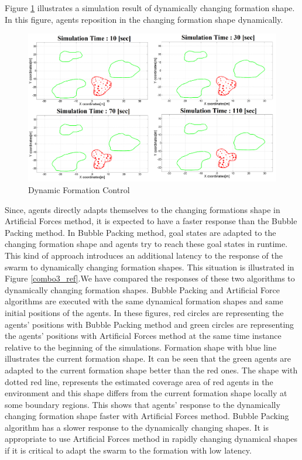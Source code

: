 \documentclass[letterpaper, 10 pt, conference]{ieeeconf}  %
\begin{document}
Figure \ref{multiple2_ref} illustrates a simulation result of dynamically changing formation shape. In this figure, agents reposition in the changing formation shape dynamically. 

\begin{figure}[thpb]
\caption{Dynamic Formation Control} \label{multiple2_ref}
\centerline{\includegraphics[scale = 0.10]{deneme}}
\end{figure} 

Since, agents directly adapts themselves to the changing formations shape in Artificial Forces method, it is expected to have a faster response than the Bubble Packing method. In Bubble Packing method, goal states are adapted to the changing formation shape and agents try to reach these goal states in runtime. This kind of approach introduces an additional latency to the response of the swarm to dynamically changing formation shapes. This situation is illustrated in Figure \ref{combo3_ref}.We have compared the responses of these two algorithms to dynamically changing formation shapes. Bubble Packing and Artificial Force algorithms are executed with the same dynamical formation shapes and same initial positions of the agents. In these figures, red circles are representing the agents' positions with Bubble Packing method and green circles are representing the agents' positions with Artificial Forces method at the same time instance relative to the beginning of the simulations. Formation shape with blue line illustrates the current formation shape. It can be seen that the green agents are adapted to the current formation shape better than the red ones. The shape with dotted red line, represents the estimated coverage area of red agents in the environment and this shape differs from the current formation shape locally at some boundary regions. This shows that agents' response to the dynamically changing formation shape faster with Artificial Forces method. Bubble Packing algorithm has a slower response to the dynamically changing shapes. It is appropriate to use Artificial Forces method in rapidly changing dynamical shapes if it is critical to adapt the swarm to the formation with low latency.
\end{document}
